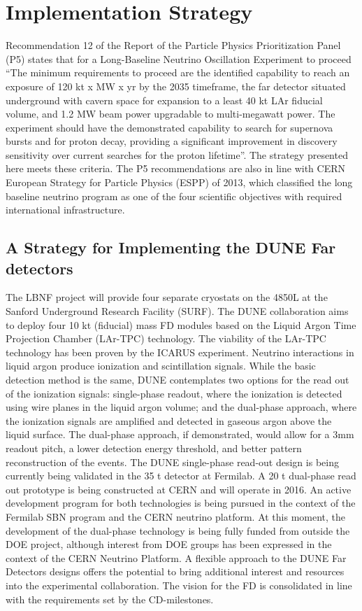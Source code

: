 \chapter{Implementation Strategy}
\label{ch:detectors-strategy}

Recommendation 12 of the Report of the Particle Physics Prioritization Panel (P5) 
states that for a Long-Baseline Neutrino Oscillation Experiment to proceed ``The 
minimum requirements to proceed are the identified capability to reach an exposure 
of 120 kt x MW x yr by the 2035 timeframe, the far detector situated underground 
with cavern space for expansion to a least 40 kt LAr fiducial volume, and 1.2 MW 
beam power upgradable to multi-megawatt power. The experiment should have the demonstrated 
capability to search for supernova bursts and for proton decay, providing a significant 
improvement in discovery sensitivity over current searches for the proton lifetime''. 
The strategy presented here meets these criteria. 
The P5 recommendations are also in line with CERN European Strategy for Particle 
Physics (ESPP) of 2013, which classified the long baseline neutrino program as 
one of the four scientific objectives with required international infrastructure.

\section{A Strategy for Implementing the DUNE Far detectors}

The LBNF project will provide four separate cryostats on the 4850L at the 
Sanford Underground Research Facility (SURF).  
The DUNE collaboration aims to deploy four 10 kt (fiducial) mass FD modules based 
on the Liquid Argon Time Projection Chamber (LAr-TPC) technology. The viability 
of the LAr-TPC technology has been proven by the ICARUS experiment. Neutrino 
interactions in liquid argon produce ionization and scintillation signals. While 
the basic detection method is the same, DUNE contemplates two options for the read 
out of the ionization signals: single-phase readout, where the ionization is detected 
using wire planes in the liquid argon volume; and the dual-phase approach, where 
the ionization signals are amplified and detected in gaseous argon above the liquid 
surface. The dual-phase approach, if demonstrated, would allow for a 3mm readout 
pitch, a lower detection energy threshold, and better pattern reconstruction of 
the events. The DUNE single-phase read-out design is being currently being validated 
in the 35 t detector at Fermilab. A 20 t dual-phase read out prototype is being 
constructed at CERN and will operate in 2016. An active development program for 
both technologies is being pursued in the context of the Fermilab SBN program and 
the CERN neutrino platform. At this moment, the development of the dual-phase technology 
is being fully funded from outside the DOE project, although interest from DOE 
groups has been expressed in the context of the CERN Neutrino Platform. A flexible 
approach to the DUNE Far Detectors designs offers the potential to bring additional 
interest and resources into the experimental collaboration. The vision for the 
FD is consolidated in line with the requirements set by the CD-milestones.

